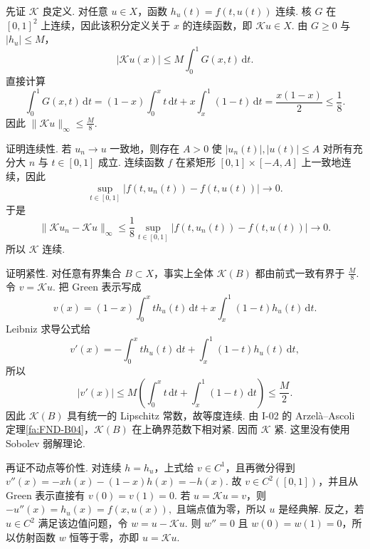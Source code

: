 \begin{FAProof}
先证 \(\displaystyle\mathcal K\) 良定义. 对任意 \(\displaystyle u\in X\)，函数 \(\displaystyle h_u(t)=f(t,u(t))\) 连续. 核 \(\displaystyle G\) 在 \(\displaystyle[0,1]^2\) 上连续，因此该积分定义关于 \(\displaystyle x\) 的连续函数，即 \(\displaystyle\mathcal Ku\in X\). 由 \(\displaystyle G\geqslant0\) 与 \(\displaystyle|h_u|\leqslant M\)，
\[
|\mathcal Ku(x)|
\leqslant
M\int_0^1G(x,t)\,\mathrm{d}t.
\]
直接计算
\[
\int_0^1G(x,t)\,\mathrm{d}t
=
(1-x)\int_0^x t\,\mathrm{d}t
+x\int_x^1(1-t)\,\mathrm{d}t
=
\frac{x(1-x)}{2}
\leqslant
\frac{1}{8}.
\]
因此
\(\displaystyle \|\mathcal Ku\|_{\infty} \leqslant \frac{M}{8}.\)

证明连续性. 若 \(\displaystyle u_n\to u\) 一致地，则存在 \(\displaystyle A>0\) 使 \(\displaystyle|u_n(t)|,|u(t)|\leqslant A\) 对所有充分大 \(\displaystyle n\) 与 \(\displaystyle t\in[0,1]\) 成立. 连续函数 \(\displaystyle f\) 在紧矩形 \(\displaystyle[0,1]\times[-A,A]\) 上一致地连续，因此
\[
\sup_{t\in[0,1]}
|f(t,u_n(t))-f(t,u(t))|
\longrightarrow0.
\]
于是
\[
\|\mathcal Ku_n-\mathcal Ku\|_{\infty}
\leqslant
\frac{1}{8}
\sup_{t\in[0,1]}
|f(t,u_n(t))-f(t,u(t))|
\longrightarrow0.
\]
所以 \(\displaystyle\mathcal K\) 连续.

证明紧性. 对任意有界集合 \(\displaystyle B\subset X\)，事实上全体 \(\displaystyle\mathcal K(B)\) 都由前式一致有界于 \(\displaystyle \frac{M}{8}\). 令 \(\displaystyle v=\mathcal Ku\). 把 Green 表示写成
\[
v(x)
=
(1-x)\int_0^x t h_u(t)\,\mathrm{d}t
+x\int_x^1(1-t)h_u(t)\,\mathrm{d}t.
\]
Leibniz 求导公式给
\[
v'(x)
=
-\int_0^x t h_u(t)\,\mathrm{d}t
+
\int_x^1(1-t)h_u(t)\,\mathrm{d}t,
\]
所以
\[
|v'(x)|
\leqslant
M\left(
\int_0^x t\,\mathrm{d}t+
\int_x^1(1-t)\,\mathrm{d}t
\right)
\leqslant
\frac{M}{2}.
\]
因此 \(\displaystyle\mathcal K(B)\) 具有统一的 Lipschitz 常数，故等度连续. 由 I-02 的 Arzelà--Ascoli 定理\autoref{fa:FND-B04}，\(\displaystyle\mathcal K(B)\) 在上确界范数下相对紧. 因而 \(\displaystyle\mathcal K\) 紧. 这里没有使用 Sobolev 弱解理论.

再证不动点等价性. 对连续 \(\displaystyle h=h_u\)，上式给 \(\displaystyle v\in C^1\)，且再微分得到
\(\displaystyle v''(x) = -xh(x)-(1-x)h(x) = -h(x).\)
故 \(\displaystyle v\in C^2([0,1])\)，并且从 Green 表示直接有 \(\displaystyle v(0)=v(1)=0\). 若 \(\displaystyle u=\mathcal Ku=v\)，则
\(\displaystyle -u''(x) = h_u(x) = f(x,u(x)),\)
且端点值为零，所以 \(\displaystyle u\) 是经典解. 反之，若 \(\displaystyle u\in C^2\) 满足该边值问题，令 \(\displaystyle w=u-\mathcal Ku\). 则 \(\displaystyle w''=0\) 且 \(\displaystyle w(0)=w(1)=0\)，所以仿射函数 \(\displaystyle w\) 恒等于零，亦即 \(\displaystyle u=\mathcal Ku\).


\end{FAProof}

